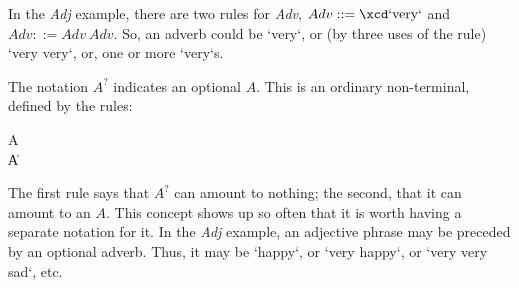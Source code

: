 In the {\em Adj} example, there are two rules for {\it Adv}, 
$Adv \mathrel{::=} \mbox{\xcd`very`}$ and
$Adv \mathrel{::=} Adv~Adv$.  So, an adverb could be \xcd`very`, or (by three
uses of the rule) \xcd`very very`, or, one or more \xcd`very`s.  

The notation $A^{?}$ indicates an optional $A$.  This is an ordinary
non-terminal, defined by the rules:\\ 
\begin{bbgrammar}
A\opt \:  \\
    \| A
\end{bbgrammar}
The first rule says that $A^?$ can amount to nothing; the second, that it can
amount to an $A$.  This concept shows up so often that it is worth having a
separate notation for it.  In the {\em Adj} example, an adjective phrase may be
preceded by an optional adverb. Thus, it may be \xcd`happy`, or 
\xcd`very happy`, or \xcd`very very sad`, etc. 
